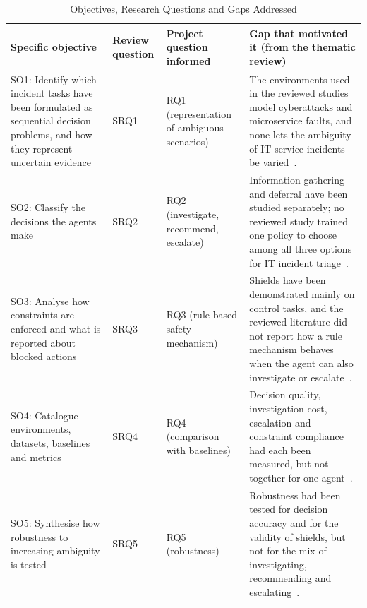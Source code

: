 \begin{table}[!t]
\centering
\caption{Objectives, Research Questions and Gaps Addressed}
\label{tab:objectives}
\footnotesize
\begin{tabularx}{\textwidth}{@{}P{3.6cm}P{1.1cm}P{2.3cm}L@{}}
\toprule
Specific objective & Review question & Project question informed & Gap that motivated it (from the thematic review) \\
\midrule
SO1: Identify which incident tasks have been formulated as sequential decision problems, and how they represent uncertain evidence & SRQ1 & RQ1 (representation of ambiguous scenarios) & The environments used in the reviewed studies model cyberattacks and microservice faults, and none lets the ambiguity of IT service incidents be varied~\cite{hammar2025,dunsin2025,wang2023hrlhf}. \\
SO2: Classify the decisions the agents make & SRQ2 & RQ2 (investigate, recommend, escalate) & Information gathering and deferral have been studied separately; no reviewed study trained one policy to choose among all three options for IT incident triage~\cite{janisch2019,kim2025,madras2018,joshi2023}. \\
SO3: Analyse how constraints are enforced and what is reported about blocked actions & SRQ3 & RQ3 (rule-based safety mechanism) & Shields have been demonstrated mainly on control tasks, and the reviewed literature did not report how a rule mechanism behaves when the agent can also investigate or escalate~\cite{alshiekh2018,konighofer2025,alauthman2026}. \\
SO4: Catalogue environments, datasets, baselines and metrics & SRQ4 & RQ4 (comparison with baselines) & Decision quality, investigation cost, escalation and constraint compliance had each been measured, but not together for one agent~\cite{remil2024,levy2026,pacella2026}. \\
SO5: Synthesise how robustness to increasing ambiguity is tested & SRQ5 & RQ5 (robustness) & Robustness had been tested for decision accuracy and for the validity of shields, but not for the mix of investigating, recommending and escalating~\cite{kim2025,hammar2025,hamel2026}. \\
\bottomrule
\end{tabularx}
\end{table}
